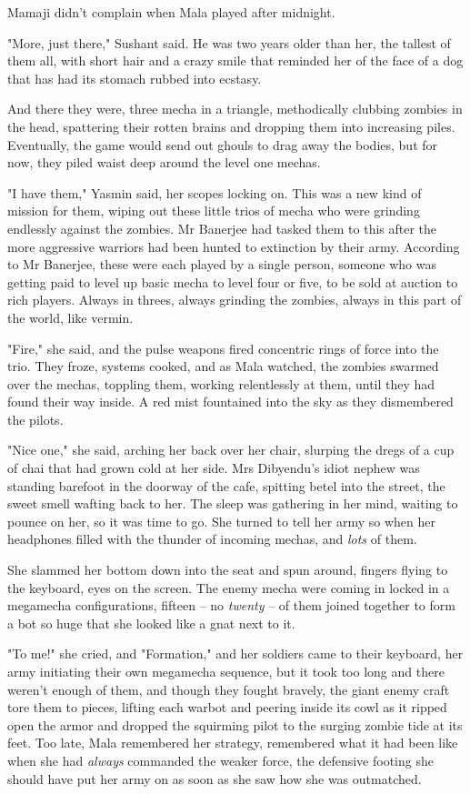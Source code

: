 Mamaji didn't complain when Mala played after midnight.

"More, just there," Sushant said. He was two years older than her,
the tallest of them all, with short hair and a crazy smile that
reminded her of the face of a dog that has had its stomach rubbed
into ecstasy.

And there they were, three mecha in a triangle, methodically
clubbing zombies in the head, spattering their rotten brains and
dropping them into increasing piles. Eventually, the game would
send out ghouls to drag away the bodies, but for now, they piled
waist deep around the level one mechas.

"I have them," Yasmin said, her scopes locking on. This was a new
kind of mission for them, wiping out these little trios of mecha
who were grinding endlessly against the zombies. Mr Banerjee had
tasked them to this after the more aggressive warriors had been
hunted to extinction by their army. According to Mr Banerjee, these
were each played by a single person, someone who was getting paid
to level up basic mecha to level four or five, to be sold at
auction to rich players. Always in threes, always grinding the
zombies, always in this part of the world, like vermin.

"Fire," she said, and the pulse weapons fired concentric rings of
force into the trio. They froze, systems cooked, and as Mala
watched, the zombies swarmed over the mechas, toppling them,
working relentlessly at them, until they had found their way
inside. A red mist fountained into the sky as they dismembered the
pilots.

"Nice one," she said, arching her back over her chair, slurping the
dregs of a cup of chai that had grown cold at her side. Mrs
Dibyendu's idiot nephew was standing barefoot in the doorway of the
cafe, spitting betel into the street, the sweet smell wafting back
to her. The sleep was gathering in her mind, waiting to pounce on
her, so it was time to go. She turned to tell her army so when her
headphones filled with the thunder of incoming mechas, and
\emph{lots} of them.

She slammed her bottom down into the seat and spun around, fingers
flying to the keyboard, eyes on the screen. The enemy mecha were
coming in locked in a megamecha configurations, fifteen -- no
\emph{twenty} -- of them joined together to form a bot so huge that
she looked like a gnat next to it.

"To me!" she cried, and "Formation," and her soldiers came to their
keyboard, her army initiating their own megamecha sequence, but it
took too long and there weren't enough of them, and though they
fought bravely, the giant enemy craft tore them to pieces, lifting
each warbot and peering inside its cowl as it ripped open the armor
and dropped the squirming pilot to the surging zombie tide at its
feet. Too late, Mala remembered her strategy, remembered what it
had been like when she had \emph{always} commanded the weaker
force, the defensive footing she should have put her army on as
soon as she saw how she was outmatched.

